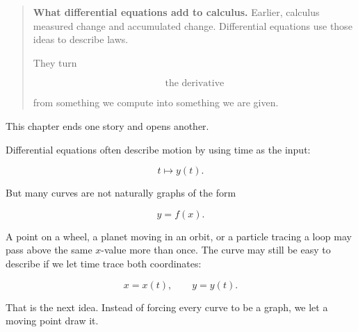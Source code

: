 \begin{quote}
\textbf{What differential equations add to calculus.}
Earlier, calculus measured change and accumulated change.  Differential equations use
those ideas to describe laws.

They turn

\[
\text{the derivative}
\]

from something we compute into something we are given.
\end{quote}

This chapter ends one story and opens another.

Differential equations often describe motion by using time as the input:

\[
t\longmapsto y(t).
\]

But many curves are not naturally graphs of the form

\[
y=f(x).
\]

A point on a wheel, a planet moving in an orbit, or a particle tracing a loop may pass
above the same \(x\)-value more than once.  The curve may still be easy to describe if
we let time trace both coordinates:

\[
x=x(t),
\qquad
y=y(t).
\]

That is the next idea.  Instead of forcing every curve to be a graph, we let a moving
point draw it.

